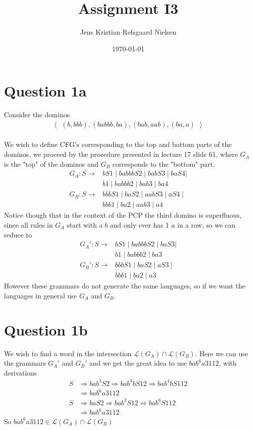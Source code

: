 \documentclass{article}
\theoremstyle{remark}
\numberwithin{equation}{section}
\begin{document}
	\author{Jens Kristian Refsgaard Nielsen}
	\title{Assignment I3}
	\date{\today}
	\maketitle
\section{Question 1a}
Consider the dominos
\begin{align}
	\langle\text{ } (b,bbb) , (babbb,ba),(bab,aab),(ba,a) \text{ }\rangle
\end{align}\\
We wish to define CFG's corresponding to the top and bottom parts of the dominos, we proceed by the procedure presented in lecture 17 slide 61, where $G_A$ is the "top" of the dominos and $G_B$ corresponds to the "bottom" part.
\begin{align*}
	G_A: S \rightarrow &bS1\mid babbbS2\mid babS3 \mid baS4 |\\
	&b1\mid babbb2\mid bab3\mid ba4\\
	G_B: S \rightarrow &bbbS1\mid baS2\mid aabS3\mid aS4\mid\\
	&bbb1\mid ba2\mid aab3\mid a4
\end{align*}
Notice though that in the context of the PCP the third domino is superfluous, since all rules in $G_A$ start with a $b$ and only ever has 1 $a$ in a row, so we can reduce to
\begin{align*}
G_A': S \rightarrow &bS1\mid babbbS2\mid baS3 |\\
&b1\mid babbb2\mid ba3\\
G_B': S \rightarrow &bbbS1\mid baS2\mid aS3\mid\\
&bbb1\mid ba2\mid a3
\end{align*}
However these grammars do not generate the same languages, so if we want the languages in general use $G_A$ and $G_B$.
\section{Question 1b}
We wish to find a word in the intersection $\mathcal{L}(G_A)\cap\mathcal{L}(G_B)$. Here we can use the grammars $G_A'$ and $G_B'$ and we get the great idea to use $bab^6a3112$, with derivations
\begin{align*}
	S &\Rightarrow bab^3S2 \Rightarrow bab^3bS12 \Rightarrow bab^4bS112 \\
	  &\Rightarrow bab^6a3112\\
	S &\Rightarrow baS2 \Rightarrow bab^3S12 \Rightarrow bab^6 S 112\\ 
	  &\Rightarrow bab^6a3112
\end{align*}
So $bab^6a3112\in\mathcal{L}(G_A)\cap\mathcal{L}(G_B)$
\end{document}
